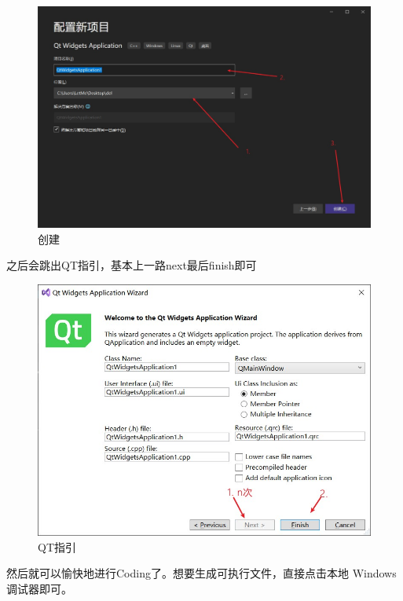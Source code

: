 \documentclass[cs4size,a4paper]{ctexart}
\numberwithin{equation}{section}
\numberwithin{table}{section}
\numberwithin{figure}{section}
\begin{document}
\begin{figure}[H]
\small
\centering
\includegraphics[width=\textwidth]{创建.jpg}
\caption{创建} \label{fig:创建}
\end{figure}

之后会跳出QT指引，基本上一路\colorbox{LetMeFlyGray}{next}最后\colorbox{LetMeFlyGray}{finish}即可

\begin{figure}[H]
\small
\centering
\includegraphics[width=\textwidth]{QT指引.jpg}
\caption{QT指引} \label{fig:QT指引}
\end{figure}

然后就可以愉快地进行Coding了。想要生成可执行文件，直接点击\colorbox{LetMeFlyGray}{本地 Windows 调试器}即可。
\end{document}
